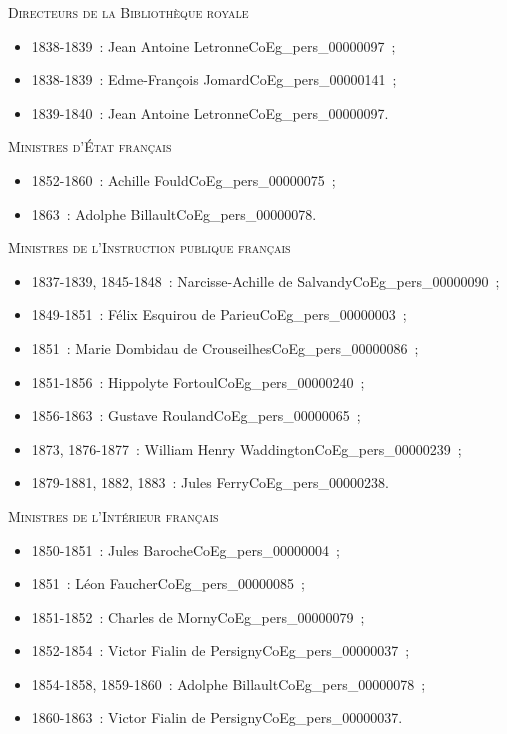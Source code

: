 \documentclass{book}
\begin{document}
{\begin{center} \textsc{Directeurs de la Bibliothèque royale} \end{center} \begin{itemize}
\item 1838-1839~: Jean Antoine Letronne\gls{CoEg_pers_00000097}~;
\item 1838-1839~: Edme-François Jomard\gls{CoEg_pers_00000141}~;
\item 1839-1840~: Jean Antoine Letronne\gls{CoEg_pers_00000097}.\end{itemize}

\begin{center} \textsc{Ministres d’État français}\end{center} \begin{itemize}
\item 1852-1860~: Achille Fould\gls{CoEg_pers_00000075}~;
\item 1863~: Adolphe Billault\gls{CoEg_pers_00000078}. \end{itemize}

\begin{center} \textsc{Ministres de l’Instruction publique français}\end{center} \begin{itemize}
\item 1837-1839, 1845-1848~: Narcisse-Achille de Salvandy\gls{CoEg_pers_00000090}~;
\item 1849-1851~: Félix Esquirou de Parieu\gls{CoEg_pers_00000003}~;
\item 1851~: Marie Dombidau de Crouseilhes\gls{CoEg_pers_00000086}~;
\item 1851-1856~: Hippolyte Fortoul\gls{CoEg_pers_00000240}~;
\item 1856-1863~: Gustave Rouland\gls{CoEg_pers_00000065}~;
\item 1873, 1876-1877~: William Henry Waddington\gls{CoEg_pers_00000239}~;
\item 1879-1881, 1882, 1883~: Jules Ferry\gls{CoEg_pers_00000238}. \end{itemize}

\begin{center} \textsc{Ministres de l’Intérieur français}\end{center} \begin{itemize}
\item 1850-1851~: Jules Baroche\gls{CoEg_pers_00000004}~;
\item 1851~: Léon Faucher\gls{CoEg_pers_00000085}~;
\item 1851-1852~: Charles de Morny\gls{CoEg_pers_00000079}~;
\item 1852-1854~: Victor Fialin de Persigny\gls{CoEg_pers_00000037}~;
\item 1854-1858, 1859-1860~: Adolphe Billault\gls{CoEg_pers_00000078}~;
\item 1860-1863~: Victor Fialin de Persigny\gls{CoEg_pers_00000037}. \end{itemize}

}
\end{document}
